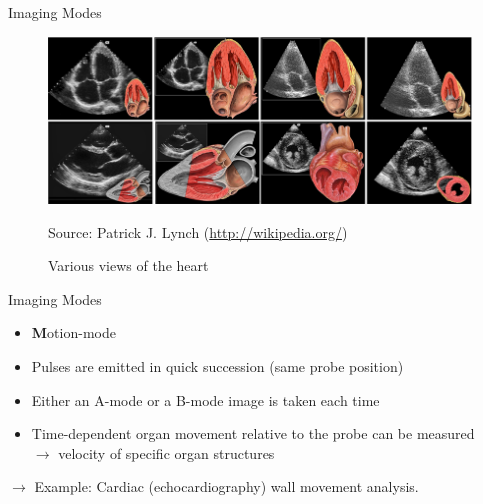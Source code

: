 \begin{frame}{Imaging Modes \cont}


    \begin{figure}
        \centering
        \includegraphics[width=.95\columnwidth]{images/b-mode_various.png}
        \caption{\normalsize Various views of the heart}
        \vspace{-0.7cm}
        \begin{flushright}
            \tiny Source: Patrick J. Lynch (\url{http://wikipedia.org/})
        \end{flushright}
    \end{figure}

\end{frame}


\begin{frame}{Imaging Modes \cont}

    \begin{itemize}
        \item \textbf{M}otion-mode
        \item Pulses are emitted in quick succession (same probe position)
        \item Either an A-mode or a B-mode image is taken each time
        \item Time-dependent organ movement relative to the probe can be measured\\
              $\rightarrow$ velocity of specific organ structures
    \end{itemize}

    \vspace{1cm}
    $\rightarrow$ Example: Cardiac (echocardiography) wall movement analysis.

\end{frame}


